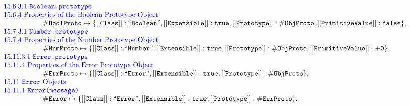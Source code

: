 \documentclass[a4paper, leqno]{amsart}
\def\inblue{\color{blue}}
\newcommand{\false}{{\tt false}}
\newcommand{\true}{{\tt true}}
\def\inblue{\color{blue}}
\begin{document}
\[\begin{array}{rl}
\multicolumn{2}{l}{\mbox{\inblue 15.6.3.1 {\tt Boolean.prototype}}}\\
\multicolumn{2}{l}{\mbox{\inblue 15.6.4 Properties of the Boolean Prototype Object}}\\
\multicolumn{2}{l}{\phantom{\emph{InitHeap} = \{}
{\tt\#BoolProto} \mapsto \{{\tt [[Class]]: ``Boolean"}, {\tt [[Extensible]]: \true}, {\tt [[Prototype]]: \#ObjProto}, {\tt [[PrimitiveValue]]: \false} \},}\\

\multicolumn{2}{l}{\mbox{\inblue 15.7.3.1 {\tt Number.prototype}}}\\
\multicolumn{2}{l}{\mbox{\inblue 15.7.4 Properties of the Number Prototype Object}}\\
\multicolumn{2}{l}{\phantom{\emph{InitHeap} = \{}
{\tt\#NumProto} \mapsto \{{\tt [[Class]]: ``Number"}, {\tt [[Extensible]]: \true}, {\tt [[Prototype]]: \#ObjProto},
{\tt [[PrimitiveValue]]: {\tt+0}} \},}\\%

\multicolumn{2}{l}{\mbox{\inblue 15.11.3.1 {\tt Error.prototype}}}\\
\multicolumn{2}{l}{\mbox{\inblue 15.11.4 Properties of the Error Prototype Object}}\\
\multicolumn{2}{l}{\phantom{\emph{InitHeap} = \{}
{\tt\#ErrProto} \mapsto \{{\tt [[Class]]: ``Error"}, {\tt [[Extensible]]: \true}, {\tt [[Prototype]]: \#ObjProto}
\},}\\%

\multicolumn{2}{l}{\mbox{\inblue 15.11 {\tt Error} Objects}}\\
\multicolumn{2}{l}{\mbox{\inblue 15.11.1 {\tt Error(message)}}}\\
\multicolumn{2}{l}{\phantom{\emph{InitHeap} = \{}
{\tt\#Error} \mapsto \{{\tt [[Class]]: ``Error"}, {\tt [[Extensible]]: \true}, {\tt [[Prototype]]: \#ErrProto}
\},}\\%


\end{array}\]
\end{document}
